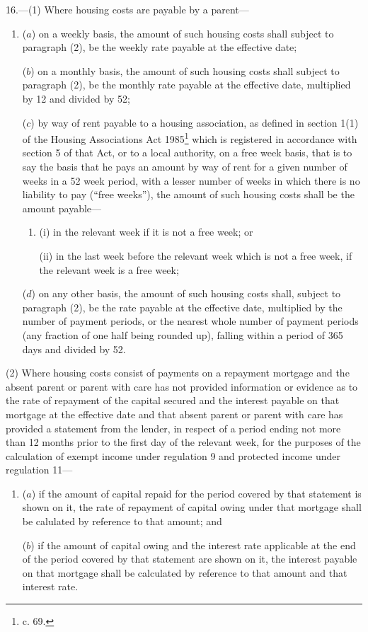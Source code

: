 \documentclass[12pt,a4paper]{article}
\begin{document}
16.—(1) 
Where housing costs are payable by a parent---  %
\begin{enumerate}\item[]
($a$) on a weekly basis, the amount of such housing costs shall subject to paragraph (2), be the weekly rate payable at the effective date;

($b$) on a monthly basis, the amount of such housing costs shall subject to paragraph (2), be the monthly rate payable at the effective date, multiplied by 12 and divided by 52;

($c$) by way of rent payable to a housing association, as defined in section 1(1) of the Housing Associations Act 1985\footnote{ c. 69.} which is registered in accordance with section 5 of that Act, or to a local authority, on a free week basis, that is to say the basis that he pays an amount by way of rent for a given number of weeks in a 52 week period, with a lesser number of weeks in which there is no liability to pay (“free weeks”), the amount of such housing costs shall be 
the amount payable---  %
\begin{enumerate}\item[]
(i) in the relevant week if it is not a free week; or

(ii) in the last week before the relevant week which is not a free week, if the relevant week is a free week;
\end{enumerate}

($d$) on any other basis, the amount of such housing costs shall, subject to paragraph (2), be the rate payable at the effective date, multiplied by the number of payment periods, or the nearest whole number of payment periods (any fraction of one half being rounded up), falling within a period of 365 days and divided by 52.
\end{enumerate}

(2) Where housing costs consist of payments on a repayment mortgage and the absent parent or parent with care has not provided information or evidence as to the rate of repayment of the capital secured and the interest payable on that mortgage at the effective date and that absent parent or parent with care has provided a statement from the lender, in respect of a period ending not more than 12 months prior to the first day of the relevant week, for the purposes of the calculation of exempt income under regulation 9 and protected income under regulation 11—
\begin{enumerate}\item[]
($a$) if the amount of capital repaid for the period covered by that statement is shown on it, the rate of repayment of capital owing under that mortgage shall be calulated by reference to that amount; and

($b$) if the amount of capital owing and the interest rate applicable at the end of the period covered by that statement are shown on it, the interest payable on that mortgage shall be calculated by reference to that amount and that interest rate.
\end{enumerate}
\end{document}
